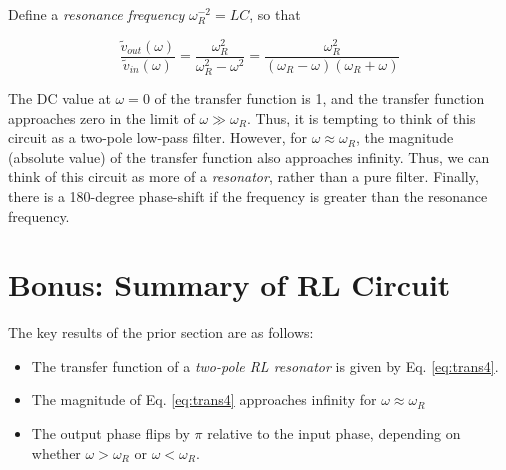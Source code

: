 \documentclass[12pt]{article}
\begin{document}
Define a \textit{resonance frequency} $\omega_R^{-2} = LC$, so that 

\begin{equation}
\boxed{
\frac{\tilde{v}_{out}(\omega)}{\tilde{v}_{in}(\omega)} = \frac{\omega_R^2}{\omega_R^2-\omega^2} = \frac{\omega_R^2}{(\omega_R-\omega)(\omega_R + \omega)}
}
\label{eq:trans4}
\end{equation}

The DC value at $\omega = 0$ of the transfer function is 1, and the transfer function approaches zero in the limit of $\omega \gg \omega_R$.  Thus, it is tempting to think of this circuit as a two-pole low-pass filter.  However, for $\omega \approx \omega_R$, the magnitude (absolute value) of the transfer function also approaches infinity.  Thus, we can think of this circuit as more of a \textit{resonator}, rather than a pure filter.  Finally, there is a 180-degree phase-shift if the frequency is greater than the resonance frequency.

\section{Bonus: Summary of RL Circuit}

The key results of the prior section are as follows:

\begin{itemize}
\item The transfer function of a \textit{two-pole RL resonator} is given by Eq. \ref{eq:trans4}.
\item The magnitude of Eq. \ref{eq:trans4} approaches infinity for $\omega \approx \omega_R$
\item The output phase flips by $\pi$ relative to the input phase, depending on whether $\omega > \omega_R$ or $\omega < \omega_R$.
\end{itemize}
\end{document}
